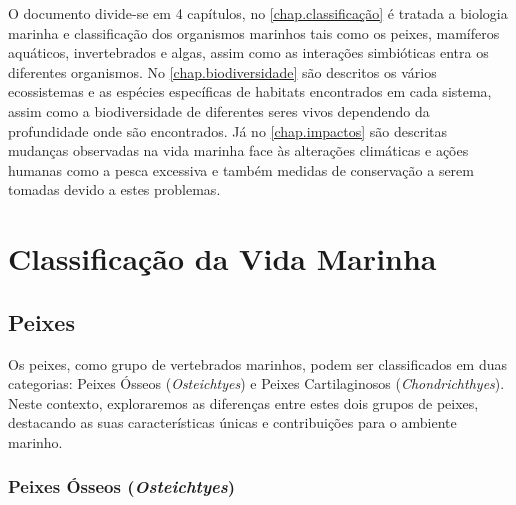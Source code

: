 \documentclass{report}
\begin{document}
O documento divide-se em 4 capítulos, no \autoref{chap.classificação} é tratada a biologia marinha e classificação dos organismos marinhos tais como os peixes, mamíferos aquáticos, invertebrados e algas, assim como as interações simbióticas entra os diferentes organismos. No \autoref{chap.biodiversidade} são descritos os vários ecossistemas e as espécies específicas de habitats encontrados em cada sistema, assim como a biodiversidade de diferentes seres vivos dependendo da profundidade onde são encontrados. Já no \autoref{chap.impactos} são descritas mudanças observadas na vida marinha face às alterações climáticas e ações humanas como a pesca excessiva e também medidas de conservação a serem tomadas devido a estes problemas.

\chapter{Classificação da Vida Marinha}
\label{chap.classificação}

\section{Peixes}
Os peixes, como grupo de vertebrados marinhos, podem ser classificados em duas categorias: Peixes Ósseos (\textit{Osteichtyes}) e Peixes Cartilaginosos (\textit{Chondrichthyes}). Neste contexto, exploraremos as diferenças entre estes dois grupos de peixes, destacando as suas características únicas e contribuições para o ambiente marinho. 
\subsection{Peixes Ósseos (\textit{Osteichtyes})}
\end{document}
